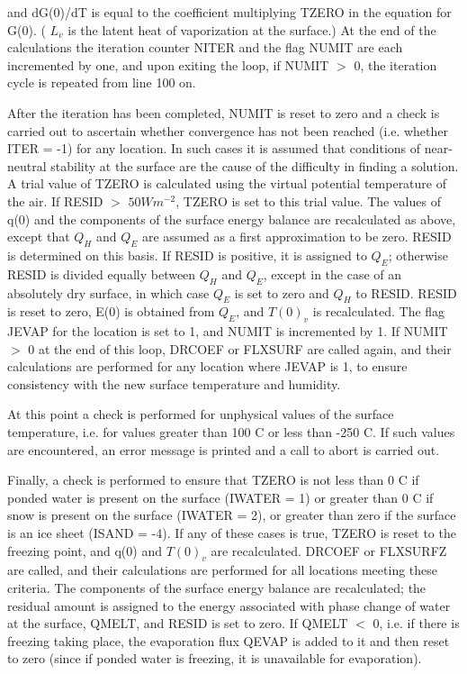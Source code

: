 and d\+G(0)/d\+T is equal to the coefficient multiplying T\+Z\+E\+R\+O in the equation for G(0). ( $L_v$ is the latent heat of vaporization at the surface.) At the end of the calculations the iteration counter N\+I\+T\+E\+R and the flag N\+U\+M\+I\+T are each incremented by one, and upon exiting the loop, if N\+U\+M\+I\+T $>$ 0, the iteration cycle is repeated from line 100 on.

After the iteration has been completed, N\+U\+M\+I\+T is reset to zero and a check is carried out to ascertain whether convergence has not been reached (i.\+e. whether I\+T\+E\+R = -\/1) for any location. In such cases it is assumed that conditions of near-\/neutral stability at the surface are the cause of the difficulty in finding a solution. A trial value of T\+Z\+E\+R\+O is calculated using the virtual potential temperature of the air. If R\+E\+S\+I\+D $>$ $50 W m^{-2}$, T\+Z\+E\+R\+O is set to this trial value. The values of q(0) and the components of the surface energy balance are recalculated as above, except that $Q_H$ and $Q_E$ are assumed as a first approximation to be zero. R\+E\+S\+I\+D is determined on this basis. If R\+E\+S\+I\+D is positive, it is assigned to $Q_E$; otherwise R\+E\+S\+I\+D is divided equally between $Q_H$ and $Q_E$, except in the case of an absolutely dry surface, in which case $Q_E$ is set to zero and $Q_H$ to R\+E\+S\+I\+D. R\+E\+S\+I\+D is reset to zero, E(0) is obtained from $Q_E$, and $T(0)_v$ is recalculated. The flag J\+E\+V\+A\+P for the location is set to 1, and N\+U\+M\+I\+T is incremented by 1. If N\+U\+M\+I\+T $>$ 0 at the end of this loop, D\+R\+C\+O\+E\+F or F\+L\+X\+S\+U\+R\+F are called again, and their calculations are performed for any location where J\+E\+V\+A\+P is 1, to ensure consistency with the new surface temperature and humidity.

At this point a check is performed for unphysical values of the surface temperature, i.\+e. for values greater than 100 C or less than -\/250 C. If such values are encountered, an error message is printed and a call to abort is carried out.

Finally, a check is performed to ensure that T\+Z\+E\+R\+O is not less than 0 C if ponded water is present on the surface (I\+W\+A\+T\+E\+R = 1) or greater than 0 C if snow is present on the surface (I\+W\+A\+T\+E\+R = 2), or greater than zero if the surface is an ice sheet (I\+S\+A\+N\+D = -\/4). If any of these cases is true, T\+Z\+E\+R\+O is reset to the freezing point, and q(0) and $T(0)_v$ are recalculated. D\+R\+C\+O\+E\+F or F\+L\+X\+S\+U\+R\+F\+Z are called, and their calculations are performed for all locations meeting these criteria. The components of the surface energy balance are recalculated; the residual amount is assigned to the energy associated with phase change of water at the surface, Q\+M\+E\+L\+T, and R\+E\+S\+I\+D is set to zero. If Q\+M\+E\+L\+T $<$ 0, i.\+e. if there is freezing taking place, the evaporation flux Q\+E\+V\+A\+P is added to it and then reset to zero (since if ponded water is freezing, it is unavailable for evaporation).

